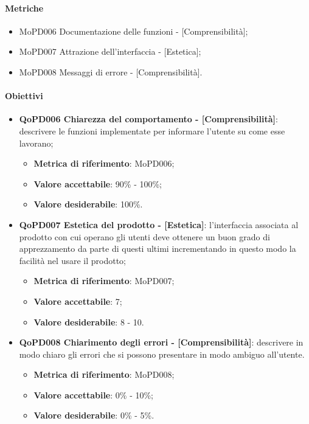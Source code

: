 \documentclass[../piano-di-qualifica.tex]{subfiles}
\begin{document}
\paragraph{Metriche}
\label{sub:metriche}
\begin{itemize}
    \item MoPD006 Documentazione delle funzioni - [Comprensibilità];
    \item MoPD007 Attrazione dell'interfaccia - [Estetica];
    \item MoPD008 Messaggi di errore - [Comprensibilità].
\end{itemize}

\paragraph{Obiettivi}
\label{sub:obiettivi}
\begin{itemize}
    \item \textbf{QoPD006 Chiarezza del comportamento - [Comprensibilità]}: descrivere le funzioni implementate per informare l'utente su come esse lavorano;
        \begin{itemize}
            \item \textbf{Metrica di riferimento}: MoPD006;
            \item \textbf{Valore accettabile}: 90\% - 100\%;
            \item \textbf{Valore desiderabile}: 100\%.
        \end{itemize}
    \item \textbf{QoPD007 Estetica del prodotto - [Estetica]}: l'interfaccia associata al prodotto con cui operano gli utenti deve ottenere un buon grado di apprezzamento da parte di questi ultimi incrementando in questo modo la facilità nel usare il prodotto;
        \begin{itemize}
            \item \textbf{Metrica di riferimento}: MoPD007;
            \item \textbf{Valore accettabile}: 7;
            \item \textbf{Valore desiderabile}: 8 - 10.
        \end{itemize}
    \item \textbf{QoPD008 Chiarimento degli errori - [Comprensibilità]}: descrivere in modo chiaro gli errori che si possono presentare in modo ambiguo all'utente.
        \begin{itemize}
            \item \textbf{Metrica di riferimento}: MoPD008;
            \item \textbf{Valore accettabile}: 0\% - 10\%;
            \item \textbf{Valore desiderabile}: 0\% - 5\%.
        \end{itemize}
\end{itemize}
\end{document}
